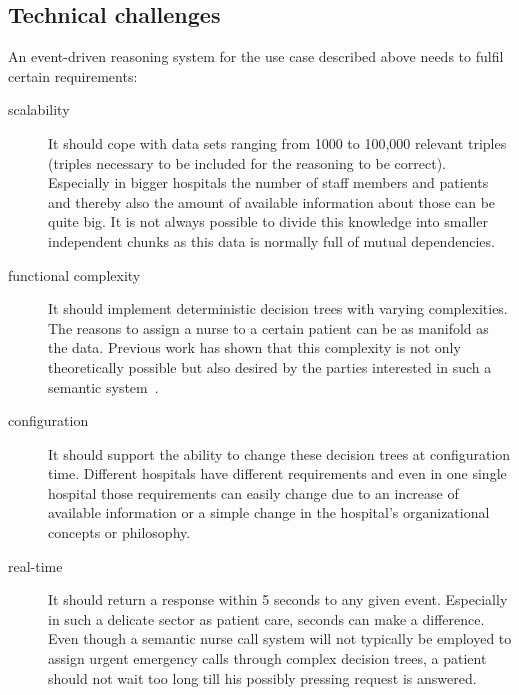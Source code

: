\subsection{Technical challenges}
An event-driven reasoning system for the use case described above needs to fulfil certain requirements:
\begin{description}
\item[scalability] It should cope with data sets ranging from 1000 to 100,000 relevant triples (\ie triples necessary to be included for the reasoning to be correct). 
Especially in bigger hospitals the number of staff members and patients and thereby also the amount of available information about those can be quite big. 
It is not always possible to divide this knowledge into smaller independent chunks as this data is normally full of mutual dependencies. 
\item[functional complexity] It should implement deterministic decision trees with varying complexities. The reasons to assign a nurse to 
a certain patient can be as manifold as the data. Previous work has shown that this complexity is not only theoretically possible but also desired by the 
parties interested in such a semantic system~\cite{accioontold}.
\item[configuration] It should support the ability to change these decision trees at configuration time. Different hospitals have different 
requirements and even in one single hospital those requirements 
can easily change due to \eg an increase of available information or a simple change in the hospital's organizational concepts or philosophy.
\item[real-time] It should return a response within 5 seconds to any given event. Especially in such a delicate sector as patient care, seconds can make a difference. 
Even though a semantic nurse call system will not typically be employed to assign urgent emergency calls  through complex decision trees, 
a patient should not wait too long till his possibly pressing request is answered.
\end{description}



